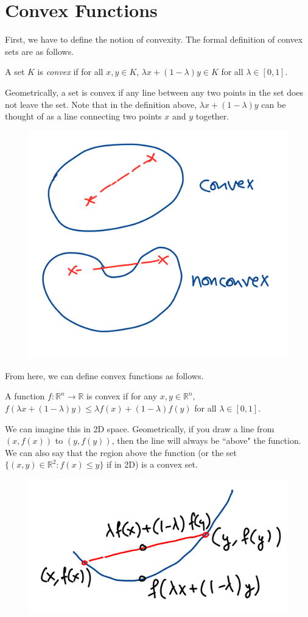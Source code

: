 \documentclass[12pt]{article}
\newcommand{\real}{\mathbb{R}}
\begin{document}
\MakeScribeTop

\section{Convex Functions}

First, we have to define the notion of convexity. The formal definition of convex sets are as follows.

\begin{definition}
	A set $K$ is \textit{convex} if for all $x, y \in K$, $\lambda x + (1-\lambda) y \in K$ for all $\lambda \in [0, 1]$. 
\end{definition}

Geometrically, a set is convex if any line between any two points in the set does not leave the set. Note that in the definition above, $\lambda x + (1-\lambda) y$ can be thought of as a line connecting two points $x$ and $y$ together.

\begin{figure}[H]
	\centering
	\includegraphics[width=0.3\linewidth]{img1}
\end{figure}


From here, we can define convex functions as follows.

\begin{definition}
	A function $f: \real^n \to \real$ is convex if for any $x, y \in \real^n$, $f(\lambda x + (1-\lambda)y) \leq \lambda f(x) + (1-\lambda) f(y)$ for all $\lambda \in [0, 1]$. 
\end{definition}

We can imagine this in 2D space. Geometrically, if you draw a line from $(x, f(x))$ to $(y, f(y))$, then the line will always be ``above" the function. We can also say that the region above the function (or the set $\{(x, y) \in \real^2 : f(x) \leq y\}$ if in 2D) is a convex set.

\begin{figure}[H]
	\centering
	\includegraphics[width=0.4\linewidth]{img2}
\end{figure}
\end{document}
